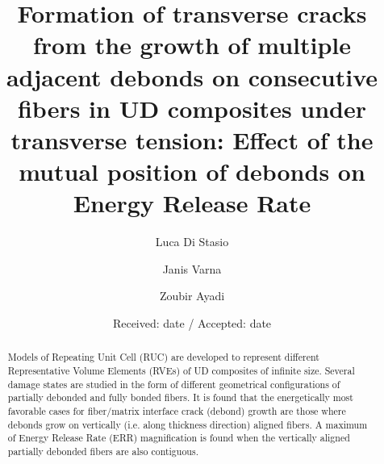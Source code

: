\documentclass[smallextended]{svjour3}       %
\begin{document}
\title{Formation of transverse cracks from the growth of multiple adjacent debonds on consecutive fibers in UD composites under transverse tension: Effect of the mutual position of debonds on Energy Release Rate
}


\author{Luca Di Stasio   \and
        Janis Varna \and
        Zoubir Ayadi
}



\date{Received: date / Accepted: date}


\maketitle

\begin{abstract}
Models of Repeating Unit Cell (RUC) are developed to represent different Representative Volume Elements (RVEs) of UD composites of infinite size. Several damage states are studied in the form of different geometrical configurations of partially debonded and fully bonded fibers. It is found that the energetically most favorable cases for fiber/matrix interface crack (debond) growth are those where debonds grow on vertically (i.e. along thickness direction) aligned fibers. A maximum of Energy Release Rate (ERR) magnification is found when the vertically aligned partially debonded fibers are also contiguous. 
\end{abstract}
\end{document}
